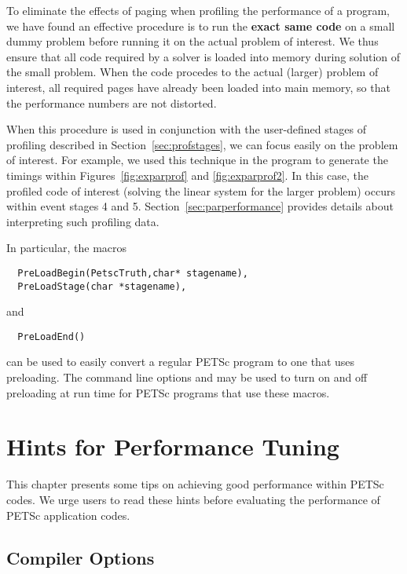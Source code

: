 To eliminate the effects of paging when profiling the performance of a
program, we have found an effective procedure is to run the {\bf exact same
code} on a small dummy problem before running it on the actual problem
of interest. We thus ensure that all code required by a solver is
loaded into memory during solution of the small problem.  When the
code procedes to the actual (larger) problem of interest, all required
pages have already been loaded into main memory, so that the
performance numbers are not distorted.

When this procedure is used in conjunction with the user-defined stages of profiling
described in Section~\ref{sec:profstages}, we can focus easily on the
problem of interest.  For example, we used this technique in the program
 to
generate the timings within Figures~\ref{fig:exparprof} and \ref{fig:exparprof2}.
In this case,
the profiled code of interest (solving the linear system for the larger problem)
occurs within event stages 4 and 5.  Section~\ref{sec:parperformance} provides
details about interpreting such profiling data.

In particular, the macros 
\begin{verbatim}
  PreLoadBegin(PetscTruth,char* stagename),
  PreLoadStage(char *stagename),
\end{verbatim}
and 
\begin{verbatim}
  PreLoadEnd()
\end{verbatim}
can be used to easily 
convert a regular PETSc program to one that uses preloading. The command line options
  and   may be used to turn on and off
preloading at run time for PETSc programs that use these macros. 
  

\chapter{Hints for Performance Tuning} 
\label{ch:performance} 

This chapter presents some tips on achieving good performance within
PETSc codes.  We urge users to read these hints before
evaluating the performance of PETSc application codes.

\section{Compiler Options}

